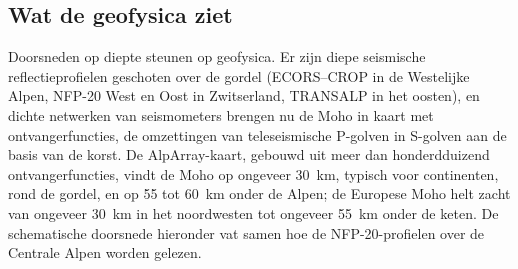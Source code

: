 \subsection*{Wat de geofysica ziet}

Doorsneden op diepte steunen op geofysica. Er zijn diepe seismische reflectieprofielen geschoten
over de gordel (ECORS--CROP in de Westelijke Alpen, NFP-20 West en Oost in
Zwitserland, TRANSALP in het oosten), en dichte netwerken van seismometers brengen nu de Moho in kaart
met ontvangerfuncties, de omzettingen van teleseismische P-golven in S-golven aan de basis van
de korst. De AlpArray-kaart, gebouwd uit meer dan honderdduizend ontvangerfuncties,
vindt de Moho op ongeveer \qty{30}{km}, typisch voor continenten, rond de gordel, en op 55 tot
\qty{60}{km} onder de Alpen; de Europese Moho helt zacht van ongeveer \qty{30}{km} in het
noordwesten tot ongeveer \qty{55}{km} onder de keten.
De schematische doorsnede hieronder vat samen hoe de NFP-20-profielen over de Centrale Alpen worden
gelezen.

